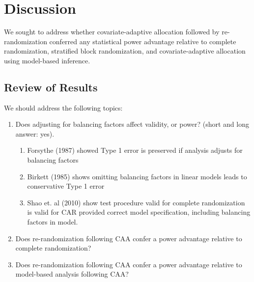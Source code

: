 \section{Discussion}
We sought to address whether covariate-adaptive allocation followed by re-randomization conferred any statistical power advantage relative to complete randomization, stratified block randomization, and covariate-adaptive allocation using model-based inference.

\subsection{Review of Results}
We should address the following topics:
\begin{enumerate}
	\item Does adjusting for balancing factors affect validity, or power? (short and long answer: yes).
	\begin{enumerate}
		\item Forsythe (1987) showed Type 1 error is preserved if analysis adjusts for balancing factors
		\item Birkett (1985) shows omitting balancing factors in linear models leads to conservative Type 1 error
		\item Shao et. al (2010) show test procedure valid for complete randomization is valid for CAR provided correct model specification, including balancing factors in model.
	\end{enumerate}
	\item Does re-randomization following CAA confer a power advantage relative to complete randomization?
	\item Does re-randomization following CAA confer a power advantage relative to model-based analysis following CAA?
\end{enumerate}

